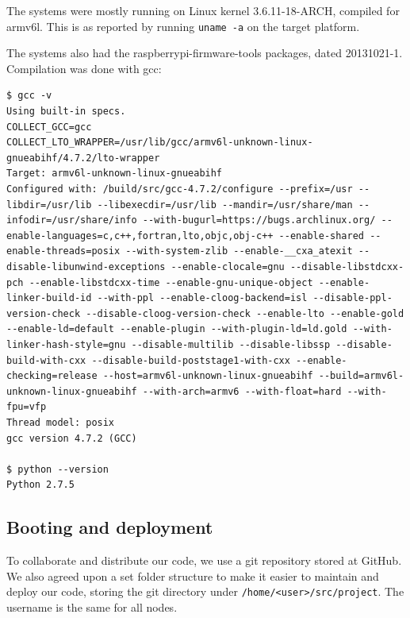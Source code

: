 The systems were mostly running on Linux kernel 3.6.11-18-ARCH, compiled for armv6l. This is as reported by running {\tt uname -a} on the target platform.

The systems also had the raspberrypi-firmware-tools packages, dated 20131021-1. Compilation was done with gcc:
\begin{lstlisting}[captionpos=b,caption={Output of {\tt gcc -v} and {\tt python --version}}]
$ gcc -v
Using built-in specs.
COLLECT_GCC=gcc
COLLECT_LTO_WRAPPER=/usr/lib/gcc/armv6l-unknown-linux-gnueabihf/4.7.2/lto-wrapper
Target: armv6l-unknown-linux-gnueabihf
Configured with: /build/src/gcc-4.7.2/configure --prefix=/usr --libdir=/usr/lib --libexecdir=/usr/lib --mandir=/usr/share/man --infodir=/usr/share/info --with-bugurl=https://bugs.archlinux.org/ --enable-languages=c,c++,fortran,lto,objc,obj-c++ --enable-shared --enable-threads=posix --with-system-zlib --enable-__cxa_atexit --disable-libunwind-exceptions --enable-clocale=gnu --disable-libstdcxx-pch --enable-libstdcxx-time --enable-gnu-unique-object --enable-linker-build-id --with-ppl --enable-cloog-backend=isl --disable-ppl-version-check --disable-cloog-version-check --enable-lto --enable-gold --enable-ld=default --enable-plugin --with-plugin-ld=ld.gold --with-linker-hash-style=gnu --disable-multilib --disable-libssp --disable-build-with-cxx --disable-build-poststage1-with-cxx --enable-checking=release --host=armv6l-unknown-linux-gnueabihf --build=armv6l-unknown-linux-gnueabihf --with-arch=armv6 --with-float=hard --with-fpu=vfp
Thread model: posix
gcc version 4.7.2 (GCC)

$ python --version
Python 2.7.5
\end{lstlisting}

\subsection{Booting and deployment}
To collaborate and distribute our code, we use a git repository stored at GitHub\cite{github}. We also agreed upon a set folder structure to make it easier to maintain and deploy our code, storing the git directory under {\tt /home/<user>/src/project}.
The username is the same for all nodes.

